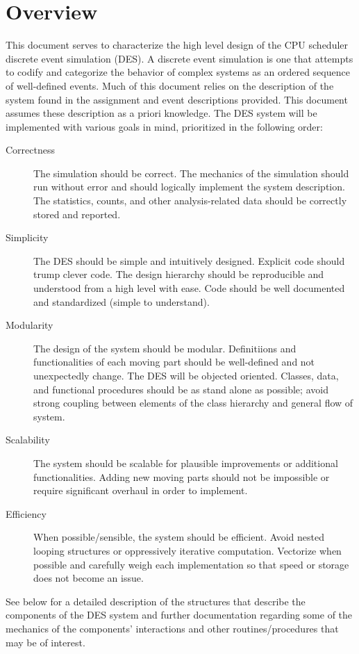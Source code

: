 \documentclass{article}
\begin{document}
\section*{Overview}
This document serves to characterize the high level design of the CPU scheduler discrete event simulation (DES). 
A discrete event simulation is one that attempts to codify and categorize the behavior of complex systems as an
ordered sequence of well-defined events. Much of this document relies on the description of the system found in the 
assignment and event descriptions provided. This document assumes these description as a priori knowledge.
The DES system will be implemented with various goals in mind, prioritized in the following order:
\begin{description}
    \item[Correctness]
        {The simulation should be correct.
         The mechanics of the simulation should run without error and should logically implement the system
         description.
         The statistics, counts, and other analysis-related data should be correctly stored and reported.
        }
    \item[Simplicity]
        {The DES should be simple and intuitively designed.
         Explicit code should trump clever code.
         The design hierarchy should be reproducible and understood from a high level with ease.
         Code should be well documented and standardized (simple to understand). 
        }
    \item[Modularity]
        {The design of the system should be modular. Definitiions and functionalities of each 
         moving part should be well-defined and not unexpectedly change. 
         The DES will be objected oriented.
         Classes, data, and functional procedures should be as stand alone as possible; avoid
         strong coupling between elements of the class hierarchy and general flow of system.
        }
    \item[Scalability]
        {The system should be scalable for plausible improvements or additional functionalities. 
         Adding new moving parts should not be impossible or require significant overhaul in order to implement. 
        }
    \item[Efficiency]
        {When possible/sensible, the system should be efficient. Avoid nested looping structures or oppressively
        iterative computation. Vectorize when possible and carefully weigh each implementation so that speed or
        storage does not become an issue.
        }
\end{description}
See below for a detailed description of the structures that describe the components of the DES system and further documentation
regarding some of the mechanics of the components' interactions and other routines/procedures that may be of interest.
\end{document}
